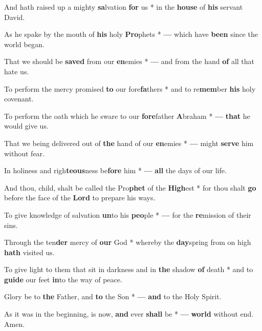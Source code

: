 \begin{multicols}{2}
	And hath raised up a mighty \textbf{sa}lvation \textbf{for} us * in the \textbf{house} of \textbf{his} servant David.
	
	As he spake by the mouth of \textbf{his} holy \textbf{Pro}phets * \textbf{---} which have \textbf{been} since the world began.
	
	That we should be \textbf{saved} from our \textbf{en}emies * \textbf{---} and from the hand \textbf{of} all that hate us.
	
	To perform the mercy promised \textbf{to} our fore\textbf{fa}thers * and to re\textbf{mem}ber \textbf{his} holy covenant.
	
	To perform the oath which he sware to our \textbf{fore}father \textbf{A}braham * \textbf{---} \textbf{that} he would give us.
	
	That we being delivered out of \textbf{the} hand of our \textbf{en}emies * \textbf{---} might \textbf{serve} him without fear.
	
	In holiness and righ\textbf{teous}ness be\textbf{fore} him * \textbf{---} \textbf{all} the days of our life.
	
	And thou, child, shalt be called the Pro\textbf{phet} of the \textbf{High}est * for thou shalt \textbf{go} before the face of the \textbf{Lord} to prepare his ways.
	
	To give knowledge of salvation \textbf{un}to his \textbf{peo}ple * \textbf{---} for the \textbf{re}mission of their sins.
	
	Through the ten\textbf{der} mercy of \textbf{our} God * whereby the \textbf{day}spring from on high \textbf{hath} visited us.
	
	To give light to them that sit in darkness and in \textbf{the} shadow \textbf{of} death * and to \textbf{guide} our feet \textbf{in}to the way of peace.
	
	Glory be to \textbf{the} Father, and \textbf{to} the Son * \textbf{---} \textbf{and} to the Holy Spirit.
	
	As it was in the beginning, is now, \textbf{and} ever \textbf{shall} be * \textbf{---} \textbf{world} without end. Amen.
\end{multicols}
